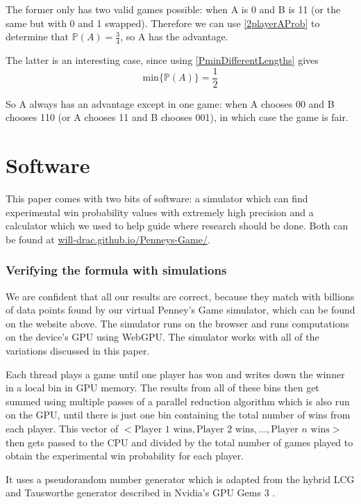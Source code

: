 \documentclass[english,12pt,a4paper,final]{article}
\begin{document}
The former only has two valid games possible: when A is 0 and B is 11 (or the same but with 0 and 1 swapped). Therefore we can use \eqref{2playerAProb} to determine that $\mathbb{P}(A)=\frac{3}{4}$, so A has the advantage.

The latter is an interesting case, since using \eqref{PminDifferentLengths} gives
\begin{equation*}
	\text{min}\{\mathbb{P}(A)\} = \frac{1}{2}
\end{equation*}

So A always has an advantage except in one game: when A chooses 00 and B chooses 110 (or A chooses 11 and B chooses 001), in which case the game is fair.

\part {Software}

This paper comes with two bits of software: a simulator which can find experimental win probability values with extremely high precision and a calculator which we used to help guide where research should be done. Both can be found at \href{https://will-drac.github.io/Penneys-Game/}{will-drac.github.io/Penneys-Game/}.

\section{Verifying the formula with simulations}

We are confident that all our results are correct, because they match with billions of data points found by our virtual Penney's Game simulator, which can be found on the website above. The simulator runs on the browser and runs computations on the device's GPU using WebGPU. The simulator works with all of the variations discussed in this paper.

Each thread plays a game until one player has won and writes down the winner in a local bin in GPU memory. The results from all of these bins then get summed using multiple passes of a parallel reduction algorithm which is also run on the GPU, until there is just one bin containing the total number of wins from each player. This vector of $<\text{Player 1 wins}, \text{Player 2 wins}, ..., \text{Player $n$ wins}>$ then gets passed to the CPU and divided by the total number of games played to obtain the experimental win probability for each player.

It uses a pseudorandom number generator which is adapted from the hybrid LCG and Tausworthe generator described in Nvidia's GPU Gems 3 \parencite{prng}.
\end{document}

